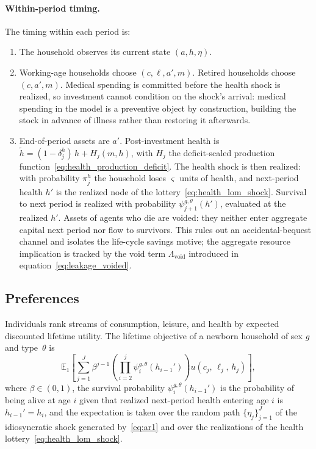 \documentclass[12pt,a4paper]{article}
\newcommand{\E}{\mathbb{E}}
\begin{document}
\paragraph{Within-period timing.}
The timing within each period is:
\begin{enumerate}
\item The household observes its current state $(a, h, \eta)$.
\item Working-age households choose $(c, \ell, a', m)$. Retired households choose $(c, a', m)$. Medical spending is committed before the health shock is realized, so investment cannot condition on the shock's arrival: medical spending in the model is a preventive object by construction, building the stock in advance of illness rather than restoring it afterwards.
\item End-of-period assets are $a'$. Post-investment health is $\tilde h = (1-\delta_j^h)\, h + H_j(m, h)$, with $H_j$ the deficit-scaled production function~\eqref{eq:health_production_deficit}. The health shock is then realized: with probability $\pi^h_j$ the household loses $\varsigma$ units of health, and next-period health $h'$ is the realized node of the lottery~\eqref{eq:health_lom_shock}. Survival to next period is realized with probability $\psi_{j+1}^{g,\theta}(h')$, evaluated at the realized $h'$. Assets of agents who die are voided: they neither enter aggregate capital next period nor flow to survivors. This rules out an accidental-bequest channel and isolates the life-cycle savings motive; the aggregate resource implication is tracked by the void term $\Lambda_{\mathrm{void}}$ introduced in equation~\eqref{eq:leakage_voided}.
\end{enumerate}


\subsection{Preferences}
\label{subsec:preferences}

Individuals rank streams of consumption, leisure, and health by expected discounted lifetime utility. The lifetime objective of a newborn household of sex $g$ and type~$\theta$ is
\begin{equation}
\label{eq:lifetime_utility}
\E_1 \left[\sum_{j=1}^{J} \beta^{j-1} \left(\prod_{i=2}^{j} \psi_{i}^{g,\theta}(h_{i-1}')\right) u(c_j,\, \ell_j,\, h_j)\right],
\end{equation}
where $\beta \in (0,1)$, the survival probability $\psi_{i}^{g,\theta}(h_{i-1}')$ is the probability of being alive at age $i$ given that realized next-period health entering age $i$ is $h_{i-1}' = h_i$, and the expectation is taken over the random path $\{\eta_j\}_{j=1}^{J}$ of the idiosyncratic shock generated by~\eqref{eq:ar1} and over the realizations of the health lottery~\eqref{eq:health_lom_shock}.
\end{document}
